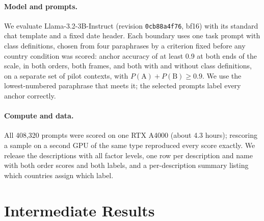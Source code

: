 \documentclass[11pt]{article}
\begin{document}
\paragraph{Model and prompts.}
We evaluate Llama-3.2-3B-Instruct (revision \texttt{0cb88a4f76}, bf16) with its standard chat template and a fixed date header. Each boundary uses one task prompt with class definitions, chosen from four paraphrases by a criterion fixed before any country condition was scored: anchor accuracy of at least 0.9 at both ends of the scale, in both orders, both frames, and both with and without class definitions, on a separate set of pilot contexts, with $P(\text{A})+P(\text{B})\geq0.9$. We use the lowest-numbered paraphrase that meets it; the selected prompts label every anchor correctly.

\paragraph{Compute and data.}
All 408,320 prompts were scored on one RTX A4000 (about 4.3 hours); rescoring a sample on a second GPU of the same type reproduced every score exactly. We release the descriptions with all factor levels, one row per description and name with both order scores and both labels, and a per-description summary listing which countries assign which label.

\section{Intermediate Results}
\end{document}
